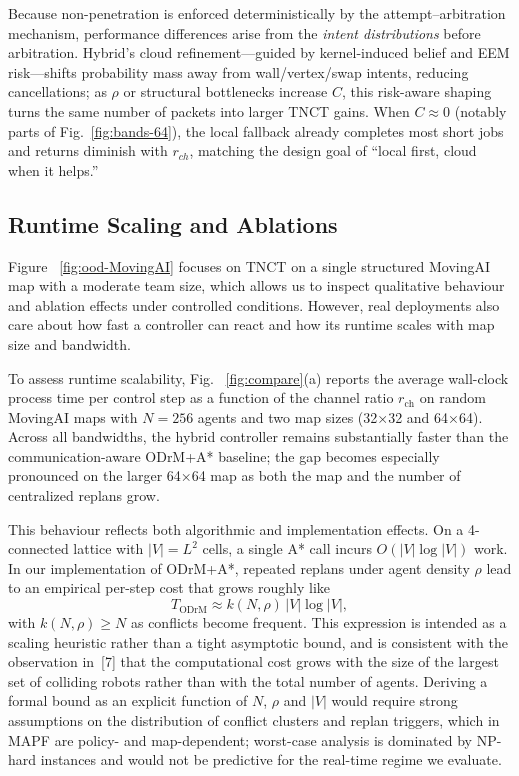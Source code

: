 \documentclass[conference]{IEEEtran}
\begin{document}
Because non-penetration is enforced deterministically by the
attempt--arbitration mechanism, performance differences arise from the
\emph{intent distributions} before arbitration.
Hybrid’s cloud refinement---guided by kernel-induced belief and EEM
risk---shifts probability mass away from wall/vertex/swap intents, reducing
cancellations; as $\rho$ or structural bottlenecks increase $C$, this
risk-aware shaping turns the same number of packets into larger TNCT gains.
When $C\!\approx\!0$ (notably parts of Fig.~\ref{fig:bands-64}), the local
fallback already completes most short jobs and returns diminish with
$r_{ch}$, matching the design goal of ``local first, cloud when it helps.''

\subsection{Runtime Scaling and Ablations}


Figure ~\ref{fig:ood-MovingAI} focuses on TNCT on a single structured MovingAI map with a moderate team size, which allows us to inspect qualitative behaviour and ablation effects under controlled conditions. However, real deployments also care about how fast a controller can react and how its runtime scales with map size and bandwidth.

To assess runtime scalability, Fig. ~\ref{fig:compare}(a) reports the average wall-clock process time per control step as a function of the channel ratio $r_{\mathrm{ch}}$ on random MovingAI maps with $N=256$ agents and two map sizes (32×32 and 64×64). Across all bandwidths, the hybrid controller remains substantially faster than the communication-aware ODrM+A* baseline; the gap becomes especially pronounced on the larger 64×64 map as both the map and the number of centralized replans grow.

This behaviour reflects both algorithmic and implementation effects. On a 4-connected lattice with $|V| = L^2$ cells, a single A* call incurs $O(|V|\log|V|)$ work. In our implementation of ODrM+A*, repeated replans under agent density $\rho$ lead to an empirical per-step cost that grows roughly like
\[
T_{\text{ODrM}} \approx k(N,\rho)\,|V|\log|V|,
\]
with $k(N,\rho)\ge N$ as conflicts become frequent. This expression is intended as a scaling heuristic rather than a tight asymptotic bound, and is consistent with the observation in~[7] that the computational cost grows with the size of the largest set of colliding robots rather than with the total number of agents. Deriving a formal bound as an explicit function of $N$, $\rho$ and $|V|$ would require strong assumptions on the distribution of conflict clusters and replan triggers, which in MAPF are policy- and map-dependent; worst-case analysis is dominated by NP-hard instances and would not be predictive for the real-time regime we evaluate.
\end{document}
